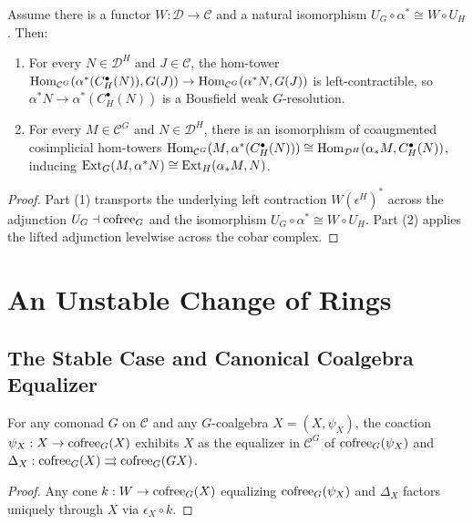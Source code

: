 \begin{proposition}
  \label{prop:generalized_shapiro}
  \leanok
  Assume there is a functor $W : \mathcal{D} \to \mathcal{C}$ and a natural isomorphism $U_G \circ \alpha^* \cong W \circ U_H$. Then:
  \begin{enumerate}
    \item For every $N \in \mathcal{D}^H$ and $J \in \mathcal{C}$, the hom-tower $\operatorname{Hom}_{\mathcal{C}^G}(\alpha^*(C^{\bullet}_H(N)), G(J)) \to \operatorname{Hom}_{\mathcal{C}^G}(\alpha^* N, G(J))$ is left-contractible, so $\alpha^* N \to \alpha^*(C^{\bullet}_H(N))$ is a Bousfield weak $G$-resolution.
    \item For every $M \in \mathcal{C}^G$ and $N \in \mathcal{D}^H$, there is an isomorphism of coaugmented cosimplicial hom-towers $\operatorname{Hom}_{\mathcal{C}^G}(M, \alpha^*(C^{\bullet}_H(N))) \cong \operatorname{Hom}_{\mathcal{D}^H}(\alpha_* M, C^{\bullet}_H(N))$, inducing $\operatorname{Ext}_G(M, \alpha^* N) \cong \operatorname{Ext}_H(\alpha_* M, N)$.
  \end{enumerate}
\end{proposition}
\begin{proof}
  \leanok
  Part (1) transports the underlying left contraction $W(\epsilon^H)^*$ across the adjunction $U_G \dashv \operatorname{cofree}_G$ and the isomorphism $U_G \circ \alpha^* \cong W \circ U_H$. Part (2) applies the lifted adjunction levelwise across the cobar complex.
\end{proof}

\chapter{An Unstable Change of Rings}

\section{The Stable Case and Canonical Coalgebra Equalizer}

\begin{proposition}
  \label{prop:canonical_equalizer}
  \leanok
  For any comonad $G$ on $\mathcal{C}$ and any $G$-coalgebra $X = (X, \psi_X)$, the coaction $\psi_X : X \to \operatorname{cofree}_G(X)$ exhibits $X$ as the equalizer in $\mathcal{C}^G$ of $\operatorname{cofree}_G(\psi_X)$ and $\Delta_X : \operatorname{cofree}_G(X) \rightrightarrows \operatorname{cofree}_G(GX)$.
\end{proposition}
\begin{proof}
  \leanok
  Any cone $k : W \to \operatorname{cofree}_G(X)$ equalizing $\operatorname{cofree}_G(\psi_X)$ and $\Delta_X$ factors uniquely through $X$ via $\epsilon_X \circ k$.
\end{proof}

